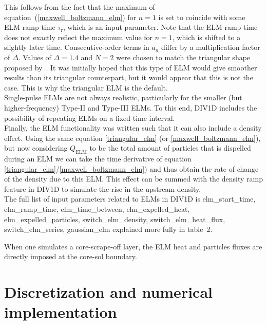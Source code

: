 \documentclass[amsmath,amssymb,a4]{revtex4-2}
\begin{document}
This follows from the fact that the maximum of equation~(\ref{maxwell_boltzmann_elm}) for $n=1$ is set to coincide with some ELM ramp time $\tau_{\mathrm{r}}$, which is an input parameter. Note that the ELM ramp time does not exactly reflect the maximum value for $n=1$, which is shifted to a slightly later time. Consecutive-order terms in $a_n$ differ by a multiplication factor of $\Delta$. Values of $\Delta=1.4$ and $N=2$ were chosen to match the triangular shape proposed by~\cite{eich2017}. It was initially hoped that this type of ELM would give smoother results than its triangular counterpart, but it would appear that this is not the case. This is why the triangular ELM is the default.\\

Single-pulse ELMs are not always realistic, particularly for the smaller (but higher-frequency) Type-II and Type-III ELMs. To this end, DIV1D includes the possibility of repeating ELMs on a fixed time interval.\\

Finally, the ELM functionality was written such that it can also include a density effect. Using the same equation \ref{triangular_elm} (or \ref{maxwell_boltzmann_elm}), but now considering $Q_{\mathrm{ELM}}$ to be the total amount of particles that is dispelled during an ELM we can take the time derivative of equation \ref{triangular_elm}/\ref{maxwell_boltzmann_elm}) and thus obtain the rate of change of the density due to this ELM. This effect can be summed with the density ramp feature in DIV1D to simulate the rise in the upstream density.\\

The full list of input parameters related to ELMs in DIV1D is
elm\_start\_time,
elm\_ramp\_time,
elm\_time\_between,
elm\_expelled\_heat,
elm\_expelled\_particles,
switch\_elm\_density,
switch\_elm\_heat\_flux,
switch\_elm\_series,
gaussian\_elm
explained more fully in table~2.

When one simulates a core-scrape-off layer, the ELM heat and particles fluxes are directly imposed at the core-sol boundary.

\section{Discretization and numerical implementation}\label{numerics}
\end{document}
